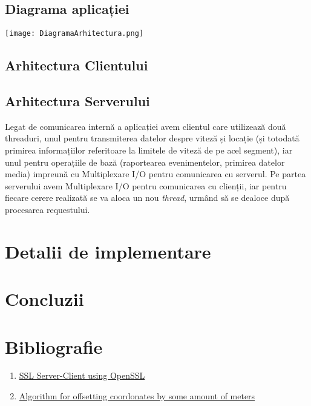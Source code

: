 \documentclass{article}
\begin{document}
\subsection{Diagrama aplicației}
\texttt{[image: DiagramaArhitectura.png]}
\subsection{Arhitectura Clientului}

\subsection{Arhitectura Serverului}
Legat de comunicarea internă a aplicației avem clientul care utilizează două threaduri, unul pentru transmiterea datelor despre viteză și locație (și totodată primirea informațiilor referitoare la limitele de viteză de pe acel segment), iar unul pentru operațiile de bază (raportearea evenimentelor, primirea datelor media) impreună cu Multiplexare I/O pentru comunicarea cu serverul. Pe partea serverului avem Multiplexare I/O pentru comunicarea cu clienții, iar pentru fiecare cerere realizată se va aloca un nou \textit{thread}, urmând să se dealoce după procesarea requestului.
\section{Detalii de implementare}
\section{Concluzii}
\section{Bibliografie}
\begin{enumerate}
    \item   \href{https://aticleworld.com/ssl-server-client-using-openssl-in-c/}{SSL Server-Client using OpenSSL}
    \item   \href{https://gis.stackexchange.com/questions/2951/algorithm-for-offsetting-a-latitude-longitude-by-some-amount-of-meters}{Algorithm for offsetting coordonates by some amount of meters}
\end{enumerate}
\end{document}
